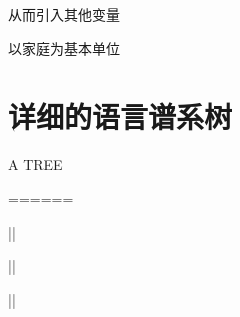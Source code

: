 \documentclass[
  a4paper,
  zihao=-4,
  fontset=mac,
  AutoFakeBold,
  AutoFakeSlant,
  oneside]{ctexbook}
\begin{document}
从而引入其他变量

以家庭为基本单位


\newpage
\appendix

\chapter{详细的语言谱系树}

A TREE

======

      ||
      
      ||
      
      ||

\newpage
%
%
%
\printbibliography[heading=bibliography,title=参考文献]
\end{document}
